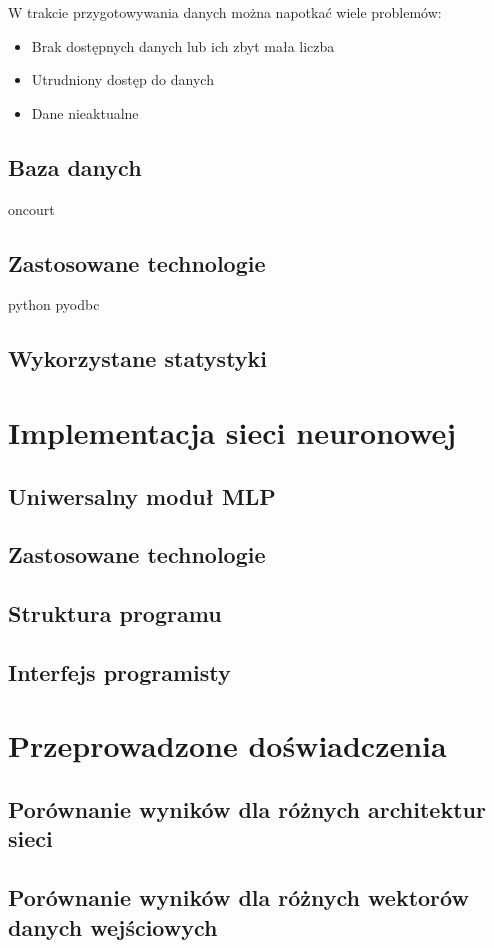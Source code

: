W trakcie przygotowywania danych można napotkać wiele problemów:
\begin{itemize}
\item Brak dostępnych danych lub ich zbyt mała liczba
\item Utrudniony dostęp do danych
\item Dane nieaktualne

\end{itemize}

\section{Baza danych}
oncourt
\section{Zastosowane technologie}
python
pyodbc
\section{Wykorzystane statystyki}

\chapter{Implementacja sieci neuronowej}
\section{Uniwersalny moduł MLP}
\section{Zastosowane technologie}
\section{Struktura programu}
\section{Interfejs programisty}

\chapter{Przeprowadzone doświadczenia}
\section{Porównanie wyników dla różnych architektur sieci}
\section{Porównanie wyników dla różnych wektorów danych wejściowych}

